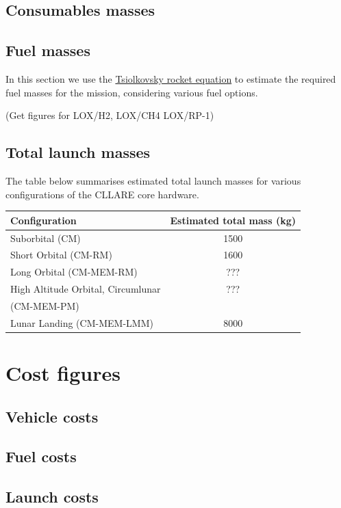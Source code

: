 \documentclass{report}
\begin{document}
\subsection{Consumables masses}

\subsection{Fuel masses}

In this section we use the \href{http://en.wikipedia.org/wiki/Tsiolkovsky_rocket_equation}{Tsiolkovsky rocket equation} to estimate the required fuel masses for the mission, considering various fuel options.

(Get figures for LOX/H2, LOX/CH4 LOX/RP-1)

\subsection{Total launch masses}

The table below summarises estimated total launch masses for various configurations of the CLLARE core hardware.

\begin{tabular}{ | l | c | }
\hline
Configuration & Estimated total mass (kg) \\
\hline
\hline
Suborbital (CM) & 1500 \\
\hline
Short Orbital (CM-RM) & 1600 \\
\hline
Long Orbital (CM-MEM-RM) & ??? \\
\hline
High Altitude Orbital, Circumlunar & ??? \\
(CM-MEM-PM) & \\
\hline
Lunar Landing (CM-MEM-LMM) & 8000 \\
\hline
\end{tabular}

\section{Cost figures}

\subsection{Vehicle costs}

\subsection{Fuel costs}

\subsection{Launch costs}
\end{document}
